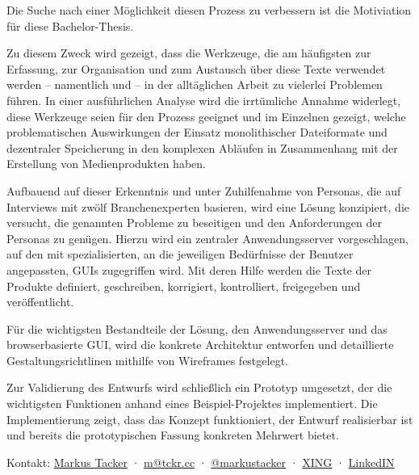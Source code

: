 \documentclass[11pt,a4paper]{article}
\begin{document}
Die Suche nach einer Möglichkeit diesen Prozess zu verbessern ist die Motiviation für diese Bachelor-Thesis. 

Zu diesem Zweck wird gezeigt, dass die Werkzeuge, die am häufigsten zur Erfassung, zur Organisation und zum Austausch über diese Texte verwendet werden -- namentlich  und  -- in der alltäglichen Arbeit zu vielerlei Problemen führen. In einer ausführlichen Analyse wird die irrtümliche Annahme widerlegt, diese Werkzeuge seien für den Prozess geeignet und im Einzelnen gezeigt, welche problematischen Auswirkungen der Einsatz monolithischer Dateiformate und dezentraler Speicherung in den komplexen Abläufen in Zusammenhang mit der Erstellung von Medienprodukten haben.

Aufbauend auf dieser Erkenntnis und unter Zuhilfenahme von Personas, die auf Interviews mit zwölf Branchenexperten basieren, wird eine Lösung konzipiert, die versucht, die genannten Probleme zu beseitigen und den Anforderungen der Personas zu genügen. Hierzu wird ein zentraler Anwendungsserver vorgeschlagen, auf den mit spezialisierten, an die jeweiligen Bedürfnisse der Benutzer angepassten, GUIs zugegriffen wird. Mit deren Hilfe werden die Texte der Produkte definiert, geschreiben, korrigiert, kontrolliert, freigegeben und veröffentlicht.

Für die wichtigsten Bestandteile der Lösung, den Anwendungsserver und das browserbasierte GUI, wird die konkrete Architektur entworfen und detaillierte Gestaltungsrichtlinen mithilfe von Wireframes festgelegt.

Zur Validierung des Entwurfs wird schließlich ein Prototyp umgesetzt, der die wichtigsten Funktionen anhand eines Beispiel-Projektes implementiert. Die Implementierung zeigt, dass das Konzept funktioniert, der Entwurf realisierbar ist und bereits die prototypischen Fassung konkreten Mehrwert bietet.

\begin{center}
\begin{small}
Kontakt: \href{http://tckr.cc/}{Markus Tacker} · \href{mailto:m@tckr.cc}{m@tckr.cc} · \href{http://twitter.com/markustacker}{@markustacker} · \href{https://www.xing.com/profile/Markus_Tacker}{XING} · \href{http://www.linkedin.com/in/markustacker}{LinkedIN}
\end{small}
\end{center}
\end{document}
